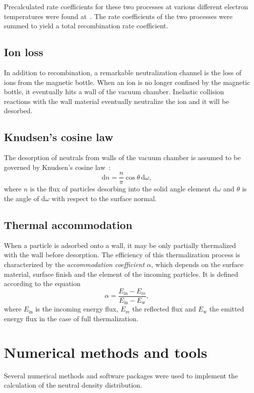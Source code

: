 \documentclass[a4paper,twoside,12pt]{article}
\begin{document}
Precalculated rate coefficients for these two processes at various different electron temperatures were found at~\cite{iaea:flychk}. The rate coefficients of the two processes were summed to yield a total recombination rate coefficient.

\subsection{Ion loss}
In addition to recombination, a remarkable neutralization channel is the loss of ions from the magnetic bottle. When an ion is no longer confined by the magnetic bottle, it eventually hits a wall of the vacuum chamber. Inelastic collision reactions with the wall material eventually neutralize the ion and it will be desorbed.

\subsection{Knudsen's cosine law}
The desorption of neutrals from walls of the vacuum chamber is assumed to be governed by Knudsen's cosine law~\cite{knudsen:cosine}:
\begin{equation}
    \mathrm{d}n = \frac{n}{\pi}\cos\theta \,\mathrm{d}\omega,
\end{equation}
where $n$ is the flux of particles desorbing into the solid angle element $\mathrm{d}\omega$ and $\theta$ is the angle of $\mathrm{d}\omega$ with respect to the surface normal.

\subsection{Thermal accommodation}
When a particle is adsorbed onto a wall, it may be only partially thermalized with the wall before desorption. The efficiency of this thermalization process is characterized by the \emph{accommodation coefficient} $\alpha$, which depends on the surface material, surface finish and the element of the incoming particles. It is defined according to the equation
\begin{equation}
    \alpha = \frac{E_\text{in} - E_\text{re}}{E_\text{in} - E_\text{w}},
\end{equation}
where $E_\text{in}$ is the incoming energy flux, $E_\text{re}$ the reflected flux and $E_\text{w}$ the emitted energy flux in the case of full thermalization.~\cite{sandia:accom}

\section{Numerical methods and tools}
Several numerical methods and software packages were used to implement the calculation of the neutral density distribution.
\end{document}
